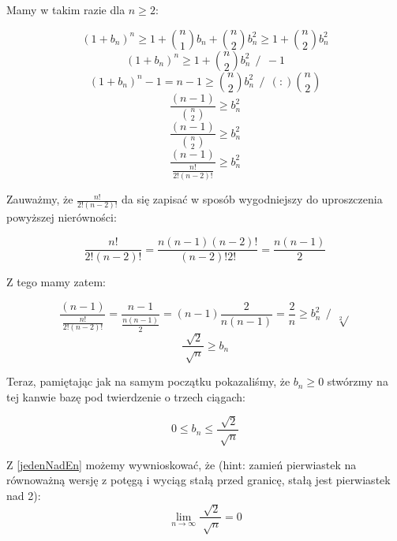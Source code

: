 \documentclass[a4paper,oneside,openright,11pt]{article}
\numberwithin{equation}{section}
\begin{document}
\noindent
Mamy w takim razie dla $n \geq 2$:

\begin{equation*}
    (1 + b_{n})^n \geq 1 + {n \choose 1}b_{n} + {n \choose 2}b_{n}^{2} \geq 1 + {n \choose 2}b_{n}^{2}
\end{equation*}
\begin{equation*}
    (1 + b_{n})^n \geq 1 + {n \choose 2}b_{n}^{2} \ \ / \ \ -1
\end{equation*}
\begin{equation*}
    (1 + b_{n})^n - 1 = n - 1 \geq {n \choose 2}b_{n}^{2}  \ \ / \ \ (:){n \choose 2}
\end{equation*}
\begin{equation*}
    \frac{(n - 1)}{{n \choose 2}} \geq b_{n}^{2} 
\end{equation*}
\begin{equation*}
    \frac{(n - 1)}{{n \choose 2}} \geq b_{n}^{2} 
\end{equation*}
\begin{equation*}
    \frac{(n - 1)}{\frac{n!}{2!(n-2)!}} \geq b_{n}^{2} 
\end{equation*}


Zauważmy, że $\frac{n!}{2!(n-2)!}$ da się zapisać w sposób wygodniejszy do uproszczenia powyższej nierówności:

\begin{equation*}
    \frac{n!}{2!(n-2)!} = \frac{n(n-1)(n-2)!}{(n-2)!2!} =  \frac{n(n-1)}{2}
\end{equation*}

Z tego mamy zatem:

\begin{equation*}
    \frac{(n - 1)}{\frac{n!}{2!(n-2)!}} = \frac{n-1}{\frac{n(n-1)}{2}} = (n-1)\frac{2}{n(n-1)} = \frac{2}{n} \geq b_{n}^{2} \ \ / \ \ \sqrt[2]{}
\end{equation*}
\begin{equation*}
    \frac{\sqrt[]{2}}{\sqrt[]{n}} \geq b_{n}
\end{equation*}

Teraz, pamiętając jak na samym początku pokazaliśmy, że $b_{n} \geq 0$ stwórzmy na tej kanwie bazę pod twierdzenie o trzech ciągach:

\begin{equation*}
    0 \leq b_{n} \leq \frac{\sqrt[]{2}}{\sqrt[]{n}}
\end{equation*}

Z \ref{jedenNadEn} możemy wywnioskować, że (hint: zamień pierwiastek na równoważną wersję z potęgą i wyciąg stałą przed granicę, stałą jest pierwiastek nad 2):
\begin{equation*}
    \lim_{n\to\infty} \frac{\sqrt[]{2}}{\sqrt[]{n}} = 0
\end{equation*}
\end{document}
